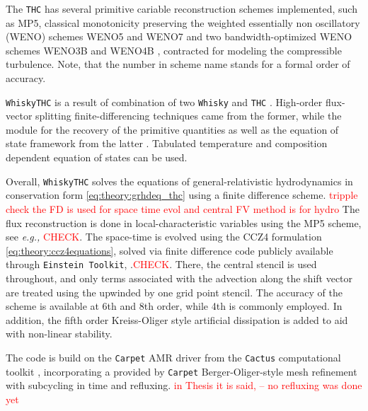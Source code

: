 \documentclass[11pt,a4paper,headinclude=true,DIV=14,BCOR=8mm,chapterprefix,listof=totoc,twoside,openright,abstracton]{scrbook}
\newcommand{\red}[1]{\textcolor{red}{#1}}
\begin{document}
The \texttt{THC} has several primitive cariable reconstruction schemes implemented, such as MP5, classical monotonicity preserving \cite{Suresh:1997,Mignone:2010} the weighted essentially non oscillatory (WENO) schemes WENO5 and WENO7 \cite{Liu:1994,Jiang:1996,Shu:1997} and two bandwidth-optimized WENO schemes WENO3B and WENO4B \cite{Martin:2006,Taylor:2007}, contracted for modeling the compressible turbulence. Note, that the number in scheme name stands for a formal order of accuracy.

\texttt{WhiskyTHC} is a result of combination of two \texttt{Whisky} \cite{Baiotti:2004wn} and \texttt{THC} \cite{Radice:2012cu}. High-order flux-vector splitting finite-differencing techniques came from the former, while the module for the recovery of the primitive quantities as well as the equation of state framework from the latter \cite{Galeazzi:2013mia}. Tabulated temperature and composition dependent equation of states can be used.

Overall, \texttt{WhiskyTHC} solves the equations of general-relativistic hydrodynamics in conservation form \ref{eq:theory:grhdeq_thc} using a finite difference scheme. \red{tripple check the FD is used for space time evol and central FV method is for hydro}
The flux reconstruction is done in local-characteristic variables using the MP5 scheme, see \textit{e.g.,} \cite{Rezzolla:2013} \red{CHECK}.
The space-time is evolved using the CCZ4 formulation \ref{eq:theory:ccz4equations}, solved via finite difference code publicly available through \texttt{Einstein Toolkit}, \cite{McLachlan,Loffler:2011ay}.\red{CHECK}.
There, the central stencil is used throughout, and only terms associated with the advection along the shift vector are treated using the upwinded by one grid point stencil. The accuracy of the scheme is available at 6th and 8th order, while 4th is commonly employed. In addition, the fifth order Kreiss-Oliger style artificial dissipation \cite{Kreiss:1973} is added to aid with non-linear stability.

The code is build on the \texttt{Carpet} AMR driver \cite{Schnetter:2003rb} from the \texttt{Cactus} computational toolkit \cite{Goodale:2003}, incorporating a provided by \texttt{Carpet} Berger-Oliger-style mesh refinement \cite{Berger:1989,Berger:1984} with subcycling in time and refluxing. \textcolor{red}{in Thesis it is said, -- no refluxing was done yet}
\end{document}

